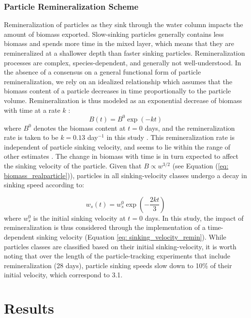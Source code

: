 \documentclass[draft,linenumbers]{agujournal2018}
\begin{document}
\subsubsection{Particle Remineralization Scheme}
\label{sec: remin_scheme}
Remineralization of particles as they sink through the water column impacts the amount of biomass exported. Slow-sinking particles generally contains less biomass and spends more time in the mixed layer, which means that they are remineralized at a shallower depth than faster sinking particles. Remineralization processes are complex, species-dependent, and generally not well-understood. In the absence of a consensus on a general functional form of particle remineralization, we rely on an idealized relationship which assumes that the biomass content of a particle decreases in time proportionally to the particle volume. Remineralization is thus modeled as an exponential decrease of biomass with time at a rate $k$ \citep{Iversen_2010, Iversen_2013}:
\begin{equation}
	B (t) = B^0\exp(-kt)
	\label{eq: remin_scheme}
\end{equation}
where $B^0$ denotes the biomass content at $t = 0$ days, and the remineralization rate is taken to be $k = 0.13$ day$^{-1}$ in this study \citep{Iversen_2010}. This remineralization rate is independent of particle sinking velocity, and seems to lie within the range of other estimates \citep{Ploug_2008, Iversen_2010, Iversen_2013}. The change in biomass with time is in turn expected to affect the sinking velocity of the particle. Given that $B \propto w^{3/2}$ (see Equation (\ref{eq: biomass_realparticle})), particles in all sinking-velocity classes undergo a decay in sinking speed according to:

\begin{equation}
w_s (t) = w_s^0\exp(-\frac{2kt}{3})
\label{eq: sinking_velocity_remin}
\end{equation}
where $w_s^0$ is the initial sinking velocity at $t = 0$ days. In this study, the impact of remineralization is thus considered through the implementation of a time-dependent sinking velocity (Equation \ref{eq: sinking_velocity_remin}). While particles classes are classified based on their initial sinking-velocity, it is worth noting that over the length of the particle-tracking experiments that include remineralization (28 days), particle sinking speeds slow down to 10\% of their initial velocity, which correspond to 3.1\5.

\section{Results}
\label{sec: Results}
\end{document}
